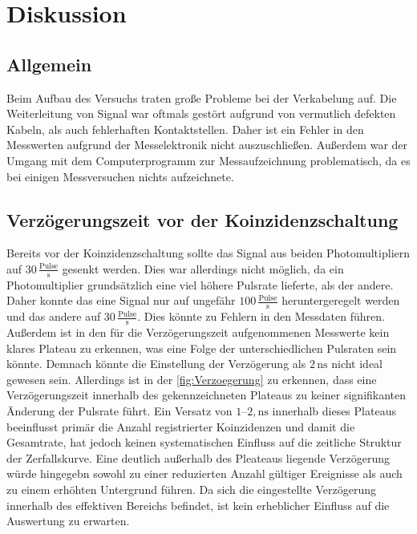 \section{Diskussion}
\label{sec:Diskussion}
\subsection{Allgemein}
Beim Aufbau des Versuchs traten große Probleme bei der Verkabelung auf. Die Weiterleitung von Signal war oftmals gestört aufgrund von vermutlich defekten Kabeln, als auch fehlerhaften Kontaktstellen. 
Daher ist ein Fehler in den Messwerten aufgrund der Messelektronik nicht auszuschließen. Außerdem war 
der Umgang mit dem Computerprogramm zur Messaufzeichnung problematisch, da es bei einigen Messversuchen nichts aufzeichnete. 

\subsection{Verzögerungszeit vor der Koinzidenzschaltung}
Bereits vor der Koinzidenzschaltung sollte das Signal aus beiden Photomultipliern auf $30 \,\frac{\text{Pulse}}{\unit{\second}}$ gesenkt 
werden. Dies war allerdings nicht möglich, da ein Photomultiplier grundsätzlich eine viel höhere Pulsrate lieferte, als der andere. 
Daher konnte das eine Signal nur auf ungefähr $100 \,\frac{\text{Pulse}}{\unit{\second}}$ heruntergeregelt werden und das andere 
auf $30 \,\frac{\text{Pulse}}{\unit{\second}}$. 
Dies könnte zu Fehlern in den Messdaten führen. 
Außerdem ist in den für die
Verzögerungszeit aufgenommenen Messwerte kein klares Plateau zu erkennen, was eine Folge der unterschiedlichen Pulsraten sein könnte. 
Demnach könnte die Einstellung der Verzögerung als $2 \, \unit{\nano\second}$ nicht ideal gewesen sein. Allerdings ist in 
der \autoref{fig:Verzoegerung} zu erkennen, dass eine Verzögerungszeit innerhalb des gekennzeichneten Plateaus zu keiner signifikanten
Änderung der Pulsrate führt.
Ein Versatz von $1$–$2, \unit{\nano\second}$ innerhalb dieses Plateaus beeinflusst primär die Anzahl registrierter Koinzidenzen und damit die Gesamtrate, hat jedoch keinen systematischen Einfluss auf die zeitliche Struktur der Zerfallskurve. 
Eine deutlich außerhalb des Pleateaus liegende Verzögerung würde hingegebn sowohl zu einer reduzierten Anzahl gültiger Ereignisse als auch zu einem erhöhten Untergrund führen. 
Da sich die eingestellte Verzögerung innerhalb des effektiven Bereichs befindet, ist kein erheblicher Einfluss auf die Auswertung zu erwarten.


